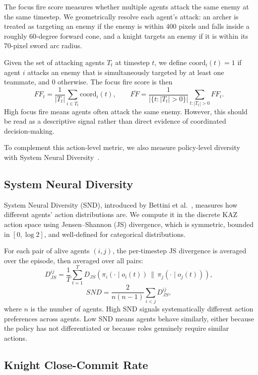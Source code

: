 The focus fire score measures whether multiple agents attack the same enemy at the same timestep. We geometrically resolve each agent's attack: an archer is treated as targeting an enemy if the enemy is within $400$ pixels and falls inside a roughly 60-degree forward cone, and a knight targets an enemy if it is within its 70-pixel sword arc radius.

Given the set of attacking agents $T_t$ at timestep $t$, we define $\mathrm{coord}_i(t) = 1$ if agent $i$ attacks an enemy that is simultaneously targeted by at least one teammate, and 0 otherwise. The focus fire score is then
\[
FF_t = \frac{1}{|T_t|}\sum_{i\in T_t}\mathrm{coord}_i(t),
\qquad
\overline{FF} =
\frac{1}{|\{t:|T_t|>0\}|}
\sum_{t:|T_t|>0} FF_t.
\]
High focus fire means agents often attack the same enemy. However, this should be read as a descriptive signal rather than direct evidence of coordinated decision-making.

To complement this action-level metric, we also measure policy-level diversity with System Neural Diversity~\cite{bettini2024snd}.

\subsection{System Neural Diversity}

System Neural Diversity (SND), introduced by Bettini et al.~\cite{bettini2024snd}, measures how different agents' action distributions are. We compute it in the discrete KAZ action space using Jensen--Shannon (JS) divergence, which is symmetric, bounded in $[0, \log 2]$, and well-defined for categorical distributions.

For each pair of alive agents $(i, j)$, the per-timestep JS divergence is averaged over the episode, then averaged over all pairs:
\[
D_{JS}^{ij} = \frac{1}{T}\sum_{t=1}^{T}
D_{JS}\!\left(\pi_i(\cdot\mid o_i(t)) \,\|\, \pi_j(\cdot\mid o_j(t))\right),
\]
\[
SND = \frac{2}{n(n-1)}\sum_{i<j} D_{JS}^{ij},
\]
where $n$ is the number of agents. High SND signals systematically different action preferences across agents. Low SND means agents behave similarly, either because the policy has not differentiated or because roles genuinely require similar actions.

\subsection{Knight Close-Commit Rate}

